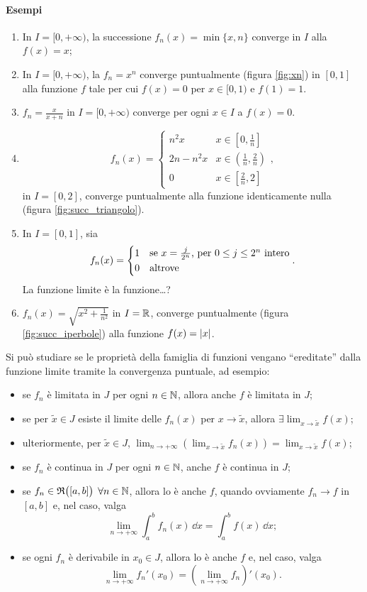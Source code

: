 \paragraph{Esempi}
\begin{enumerate}
\item In $I=[0,+\infty)$, la successione $f_n(x)=\min\{x,n\}$ converge in $I$ alla $f(x)=x$;
\item In $I=[0,+\infty)$, la $f_n=x^n$ converge puntualmente (figura \ref{fig:xn}) in $[0,1]$ alla funzione $f$ tale per cui $f(x)=0$ per $x\in[0,1)$ e $f(1)=1$.

\item $f_n=\frac{x}{x+n}$ in $I=[0,+\infty)$ converge per ogni $x\in I$ a $f(x)=0$.
\item\[
f_n(x)=\begin{cases}n^2x&x\in[0,\frac1{n}]\\ 2n-n^2x&x\in(\frac1{n},\frac2{n})\\ 0&x\in[\frac2{n},2]\end{cases},
\]
in $I=[0,2]$, converge puntualmente alla funzione identicamente nulla (figura \ref{fig:succ_triangolo}).

\item In $I=[0,1]$, sia
\[
f_n(x)=\begin{cases*}1&se $x=\frac{j}{2^n}$, per $0\leq j\leq 2^n$ intero\\ 0&altrove\end{cases*}.
\]
La funzione limite è la funzione\dots?
\item $f_n(x)=\sqrt{x^2+\frac1{n^2}}$ in $I=\mathbb{R}$, converge puntualmente (figura \ref{fig:succ_iperbole}) alla funzione $f(x)=\left|{x}\right|$.

\end{enumerate}
Si può studiare se le proprietà della famiglia di funzioni vengano ``ereditate'' dalla funzione limite tramite la convergenza puntuale, ad esempio:
\begin{itemize}
\item se $f_n$ è limitata in $J$ per ogni $n\in\mathbb{N}$, allora anche $f$ è limitata in $J$;
\item se per $\tilde{x}\in J$ esiste il limite delle $f_n(x)$ per $x\to\tilde{x}$, allora $\exists\lim_{x\to\tilde{x}}f(x)$;
\item ulteriormente, per $\tilde{x}\in J$, $\lim_{n\to+\infty}\left(\lim_{x\to\tilde{x}}f_n(x)\right)=\lim_{x\to\tilde{x}}f(x)$;
\item se $f_n$ è continua in $J$ per ogni $n\in\mathbb{N}$, anche $f$ è continua in $J$;
\item se $f_n\in\mathfrak{R}\big([a,b]\big)$ $\forall n\in\mathbb{N}$, allora lo è anche $f$, quando ovviamente $f_n\to f$ in $[a,b]$ e, nel caso, valga
\[
\lim_{n\to+\infty}\int_a^bf_n(x)\,\dd x=\int_a^bf(x)\,\dd x;
\]
\item se ogni $f_n$ è derivabile in $x_0\in J$, allora lo è anche $f$ e, nel caso, valga
\[
\lim_{n\to+\infty}f_n'(x_0)=\left(\lim_{n\to+\infty}f_n\right)'(x_0).
\]
\end{itemize}
